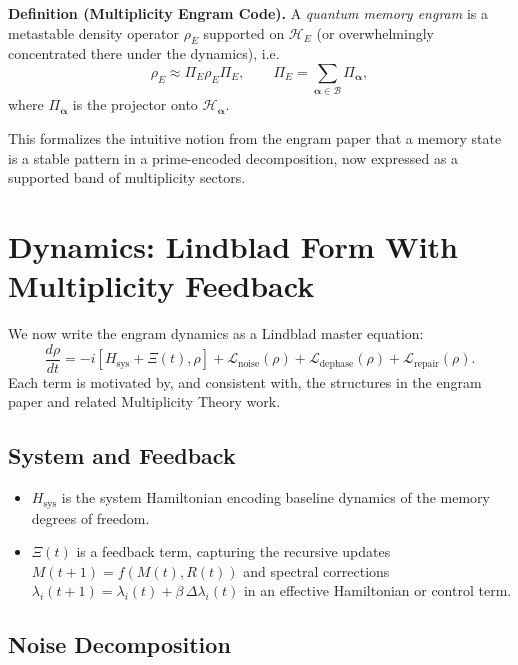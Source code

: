 \documentclass[11pt]{article}
\begin{document}
\textbf{Definition (Multiplicity Engram Code).} A \emph{quantum memory engram}
is a metastable density operator $\rho_E$ supported on $\mathcal H_E$ (or
overwhelmingly concentrated there under the dynamics), i.e.
\begin{equation}
  \rho_E \approx \Pi_E \rho_E \Pi_E, \qquad
  \Pi_E = \sum_{\boldsymbol\alpha \in \mathcal B}
          \Pi_{\boldsymbol\alpha},
\end{equation}
where $\Pi_{\boldsymbol\alpha}$ is the projector onto
$\mathcal H_{\boldsymbol\alpha}$.

This formalizes the intuitive notion from the engram paper that a memory
state is a stable pattern in a prime-encoded decomposition, now expressed as
a supported band of multiplicity sectors.

\section{Dynamics: Lindblad Form With Multiplicity Feedback}

We now write the engram dynamics as a Lindblad master equation:
\begin{equation}
  \frac{d\rho}{dt}
  = -i [H_{\text{sys}} + \Xi(t), \rho]
    + \mathcal L_{\text{noise}}(\rho)
    + \mathcal L_{\text{dephase}}(\rho)
    + \mathcal L_{\text{repair}}(\rho).
  \label{eq:master-equation}
\end{equation}
Each term is motivated by, and consistent with, the structures in the engram
paper and related Multiplicity Theory work.

\subsection{System and Feedback}

\begin{itemize}[leftmargin=*]
  \item $H_{\text{sys}}$ is the system Hamiltonian encoding baseline dynamics
        of the memory degrees of freedom.
  \item $\Xi(t)$ is a feedback term, capturing the recursive updates
        $M(t+1) = f(M(t), R(t))$ and spectral corrections
        $\lambda_i(t+1) = \lambda_i(t) + \beta \,\Delta\lambda_i(t)$ in an
        effective Hamiltonian or control term.
\end{itemize}

\subsection{Noise Decomposition}
\end{document}
